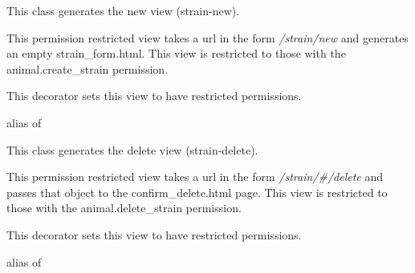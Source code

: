 \documentclass[letterpaper,10pt,english]{sphinxmanual}
\begin{document}
\begin{fulllineitems}
\label{animals:mousedb.animal.views.StrainCreate}
This class generates the new {\hyperref[animals:mousedb.animal.models.Strain]{}} view (strain-new).

This permission restricted view takes a url in the form \emph{/strain/new} and generates an empty strain\_form.html.
This view is restricted to those with the animal.create\_strain permission.

\begin{fulllineitems}
\label{animals:mousedb.animal.views.StrainCreate.dispatch}
This decorator sets this view to have restricted permissions.

\end{fulllineitems}


\begin{fulllineitems}
\label{animals:mousedb.animal.views.StrainCreate.model}
alias of 

\end{fulllineitems}


\end{fulllineitems}


\begin{fulllineitems}
\label{animals:mousedb.animal.views.StrainDelete}
This class generates the delete {\hyperref[animals:mousedb.animal.models.Strain]{}} view (strain-delete).

This permission restricted view takes a url in the form \emph{/strain/\#/delete} and passes that object to the confirm\_delete.html page.
This view is restricted to those with the animal.delete\_strain permission.

\begin{fulllineitems}
\label{animals:mousedb.animal.views.StrainDelete.dispatch}
This decorator sets this view to have restricted permissions.

\end{fulllineitems}


\begin{fulllineitems}
\label{animals:mousedb.animal.views.StrainDelete.model}
alias of 

\end{fulllineitems}


\end{fulllineitems}
\end{document}
